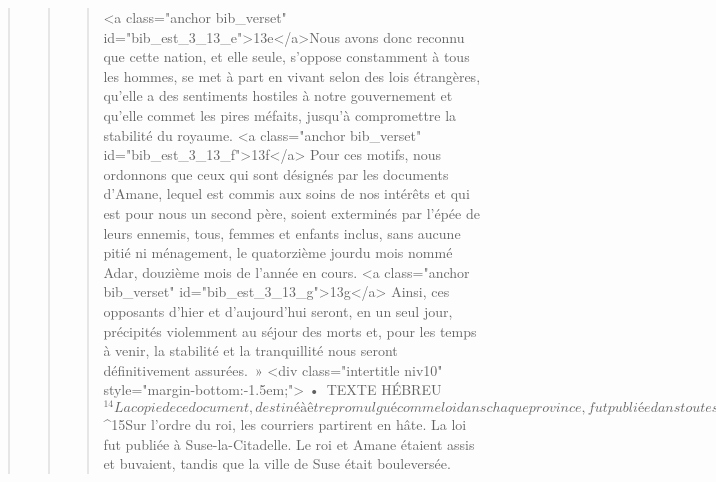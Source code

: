\begin{verse}
\begin{verse}
\begin{verse}
      <a class="anchor bib_verset" id="bib_est_3_13_e">13e</a>Nous avons donc reconnu que cette nation, et elle seule, s’oppose constamment à tous les hommes, se met à part en vivant selon des lois étrangères, qu’elle a des sentiments hostiles à notre gouvernement et qu’elle commet les pires méfaits, jusqu’à compromettre la stabilité du royaume. <a class="anchor bib_verset" id="bib_est_3_13_f">13f</a> Pour ces motifs, nous ordonnons que ceux qui sont désignés par les documents d’Amane, lequel est commis aux soins de nos intérêts et qui est pour nous un second père, soient exterminés par l’épée de leurs ennemis, tous, femmes et enfants inclus, sans aucune pitié ni ménagement, le quatorzième jourdu mois nommé Adar, douzième mois de l’année en cours. <a class="anchor bib_verset" id="bib_est_3_13_g">13g</a> Ainsi, ces opposants d’hier et d’aujourd’hui seront, en un seul jour, précipités violemment au séjour des morts et, pour les temps à venir, la stabilité et la tranquillité nous seront définitivement assurées. »
      <div class="intertitle niv10" style="margin-bottom:-1.5em;">
        • TEXTE HÉBREU
${}^{14}La copie de ce document, destiné à être promulgué comme loi dans chaque province, fut publiée dans toutes les populations, afin qu’elles soient prêtes pour le jour dit. 
${}^{15}Sur l’ordre du roi, les courriers partirent en hâte. La loi fut publiée à Suse-la-Citadelle.
      Le roi et Amane étaient assis et buvaient, tandis que la ville de Suse était bouleversée.
      

\end{verse}
\end{verse}
\end{verse}

